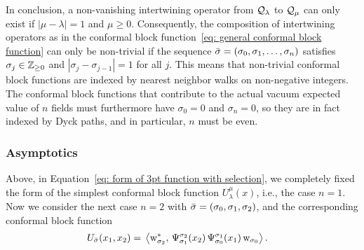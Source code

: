 \documentclass[oneside,english]{amsart}
\numberwithin{equation}{section}
\numberwithin{figure}{section}
\theoremstyle{plain}
\theoremstyle{plain}
\theoremstyle{plain}
\theoremstyle{remark}
\theoremstyle{plain}
\theoremstyle{plain}
\theoremstyle{plain}
\theoremstyle{plain}
\theoremstyle{plain}
\theoremstyle{plain}
\theoremstyle{plain}
\theoremstyle{plain}
\newcommand{\blue}[1]{{\color{blue} #1}}
\begin{document}
In conclusion, a non-vanishing intertwining operator from $\mathcal{Q}_{\lambda}$
to $\mathcal{Q}_{\mu}$ can only exist if $|\mu-\lambda|=1$ and $\mu\geq0$.
Consequently, the composition of intertwining operators as in the
conformal block function~\eqref{eq: general conformal block function}
can only be non-trivial if the sequence $\bar{\sigma}=(\sigma_{0},\sigma_{1},\ldots,\sigma_{n})$
satisfies $\sigma_{j}\in\mathbb{Z}_{\geq 0}$ and $|\sigma_{j}-\sigma_{j-1}|=1$
for all $j$. This means that non-trivial conformal block functions
are indexed by nearest neighbor walks on non-negative integers. 
The conformal block functions that contribute to the actual vacuum expected
value of $n$ fields must furthermore have $\sigma_{0}=0$ and $\sigma_{n}=0$,
so they are in fact indexed by
Dyck paths, and in particular, $n$ must be even.


\subsubsection{\textbf{Asymptotics}}

Above, in Equation~\eqref{eq: form of 3pt function with selection}, we completely
fixed the form of the simplest conformal block function $U_{\lambda}^{\mu}(x)$,
i.e., the case $n=1$. Now we consider the next case $n=2$ with $\bar{\sigma}=(\sigma_{0},\sigma_{1},\sigma_{2})$,
and the corresponding conformal block function
\begin{align*}
U_{\bar{\sigma}}(x_{1},x_{2})=\; & \left\langle  \mathrm{w}_{\sigma_{2}}^{*} , \, \Psi_{\sigma_{1}}^{\sigma_{2}}(x_{2})\,\Psi_{\sigma_{0}}^{\sigma_{1}}(x_{1})\,\mathrm{w}_{\sigma_{0}}  \right\rangle.
\end{align*}
\end{document}
